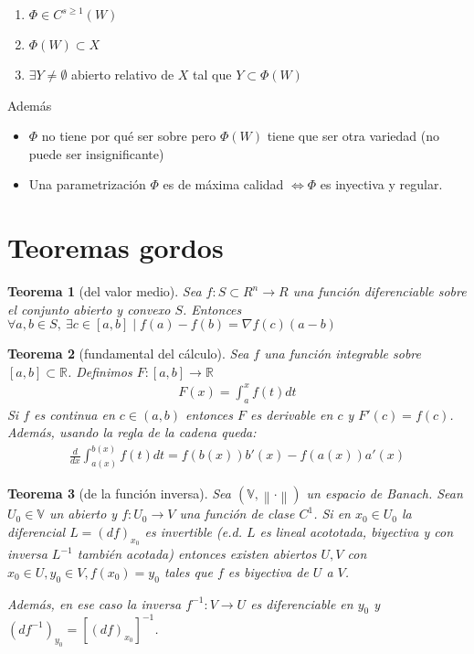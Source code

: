 \documentclass[a4paper,twocolumn]{extarticle}
\newcommand{\R}{\mathbb{R}}
\newcommand{\V}{\mathbb{V}}
\newcommand{\norma}[1]{\left\lVert#1\right\rVert}
\newtheorem*{thm}{Teorema}
\begin{document}
\begin{itemize}
\begin{enumerate}
		\item $\Phi \in C^{s \geq 1}(W)$
		\item $\Phi(W) \subset X$
		\item $\exists Y \neq \emptyset$ abierto relativo de $X$ tal que $Y \subset \Phi(W)$ 
	\end{enumerate}
	Además
	\begin{itemize}
		\item $\Phi$ no tiene por qué ser sobre pero $\Phi(W)$ tiene que ser otra variedad (no puede ser insignificante)
		\item Una parametrización $\Phi$ es de máxima calidad $\iff \Phi$ es inyectiva y regular.
	\end{itemize}
\end{itemize}

\section{Teoremas gordos}

\begin{thm}[del valor medio]
	Sea $f: S \subset R^n \to R$ una función diferenciable sobre el conjunto abierto y convexo $S$. Entonces $\forall a, b \in S,\ \exists c \in [a,b] \mid f(a) - f(b) = \nabla f(c)(a - b)$
\end{thm}

\begin{thm}[fundamental del cálculo]
	Sea $f$ una función integrable sobre $[a,b] \subset \R$. Definimos $F:[a,b] \to \R$
	\begin{align*}
		F(x) = \int_{a}^{x} f(t)dt
	\end{align*}
	Si $f$ es continua en $c \in (a,b)$ entonces $F$ es derivable en $c$ y $F'(c) = f(c)$. Además, usando la regla de la cadena queda:
	\begin{align*}
		\frac{d}{dx}\int_{a(x)}^{b(x)} f(t)dt = f(b(x))b'(x) - f(a(x))a'(x)
	\end{align*}
\end{thm}

\begin{thm}[de la función inversa]
	Sea $(\V, \norma{\cdot})$ un espacio de Banach. Sean $U_0 \in \V$ un abierto y $f:U_0 \to V$ una función de clase $C^1$. Si en $x_0 \in U_0$ la diferencial $L = (df)_{x_0}$ es invertible (e.d. $L$ es lineal acototada, biyectiva y con inversa $L^{-1}$ también acotada) entonces existen abiertos $U, V$ con $x_0 \in U, y_0 \in V, f(x_0) = y_0$  tales que $f$ es biyectiva de $U$ a $V$.
	
	Además, en ese caso la inversa $f^{-1}:V \to U$ es diferenciable en $y_0$ y $(df^{-1})_{y_0} = [(df)_{x_0}]^{-1}$.
\end{thm}
\end{document}
